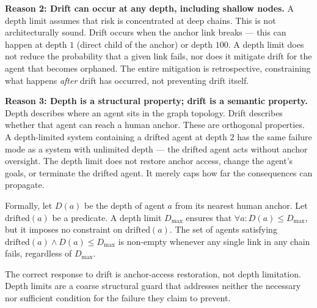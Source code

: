 \textbf{Reason 2: Drift can occur at any depth, including shallow nodes.}
A depth limit assumes that risk is concentrated at deep chains. This is not architecturally sound. Drift occurs when the anchor link breaks — this can happen at depth $1$ (direct child of the anchor) or depth $100$. A depth limit does not reduce the probability that a given link fails, nor does it mitigate drift for the agent that becomes orphaned. The entire mitigation is retrospective, constraining what happens \emph{after} drift has occurred, not preventing drift itself.

\textbf{Reason 3: Depth is a structural property; drift is a semantic property.}
Depth describes where an agent sits in the graph topology. Drift describes whether that agent can reach a human anchor. These are orthogonal properties. A depth-limited system containing a drifted agent at depth $2$ has the same failure mode as a system with unlimited depth — the drifted agent acts without anchor oversight. The depth limit does not restore anchor access, change the agent's goals, or terminate the drifted agent. It merely caps how far the consequences can propagate.

Formally, let $D(a)$ be the depth of agent $a$ from its nearest human anchor. Let $\text{drifted}(a)$ be a predicate. A depth limit $D_{\max}$ ensures that $\forall a: D(a) \leq D_{\max}$, but it imposes no constraint on $\text{drifted}(a)$. The set of agents satisfying $\text{drifted}(a) \land D(a) \leq D_{\max}$ is non-empty whenever any single link in any chain fails, regardless of $D_{\max}$.

The correct response to drift is anchor-access restoration, not depth limitation. Depth limits are a coarse structural guard that addresses neither the necessary nor sufficient condition for the failure they claim to prevent.

